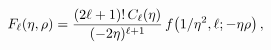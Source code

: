 \[\mathop{F_{\ell}\/}\nolimits\!\left(\eta,\rho\right)=\dfrac{(2\ell+1)!\mathop{%
C_{\ell}\/}\nolimits\!\left(\eta\right)}{(-2\eta)^{\ell+1}}\mathop{f\/}%
\nolimits\!\left(1/\eta^{2},\ell;-\eta\rho\right),\]